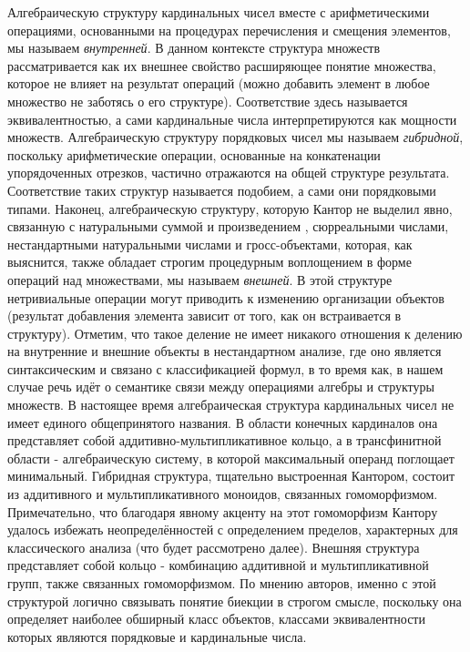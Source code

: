 \documentclass[12pt]{article}
\begin{document}
Алгебраическую структуру кардинальных чисел вместе с арифметическими операциями, основанными на процедурах перечисления и смещения элементов, мы называем {\it внутренней}. В данном контексте структура множеств рассматривается как их внешнее свойство расширяющее понятие множества, которое не влияет на результат операций (можно добавить элемент в любое множество не заботясь о его структуре). Соответствие здесь называется эквивалентностью, а сами кардинальные числа интерпретируются как мощности множеств. Алгебраическую структуру порядковых чисел мы называем {\it гибридной}, поскольку арифметические операции, основанные на конкатенации упорядоченных отрезков, частично отражаются на общей структуре результата. Соответствие таких структур называется подобием, а сами они порядковыми типами. Наконец, алгебраическую структуру, которую Кантор не выделил явно, связанную с натуральными суммой и произведением \cite{hessenberg-sum}, сюрреальными числами, нестандартными натуральными числами и гросс-объектами, которая, как выяснится, также обладает строгим процедурным воплощением в форме операций над множествами, мы называем {\it внешней}. В этой структуре нетривиальные операции могут приводить к изменению организации объектов (результат добавления элемента зависит от того, как он встраивается в структуру). Отметим, что такое деление не имеет никакого отношения к делению на внутренние и внешние объекты в нестандартном анализе, где оно является синтаксическим и связано с классификацией формул, в то время как, в нашем случае речь идёт о семантике связи между операциями алгебры и структуры множеств. В настоящее время алгебраическая структура кардинальных чисел не имеет единого общепринятого названия. В области конечных кардиналов она представляет собой аддитивно-мультипликативное кольцо, а в трансфинитной области - алгебраическую систему, в которой максимальный операнд поглощает минимальный. Гибридная структура, тщательно выстроенная Кантором, состоит из аддитивного и мультипликативного моноидов, связанных гомоморфизмом. Примечательно, что благодаря явному акценту на этот гомоморфизм Кантору удалось избежать неопределённостей с определением пределов, характерных для классического анализа (что будет рассмотрено далее). Внешняя структура представляет собой кольцо - комбинацию аддитивной и мультипликативной групп, также связанных гомоморфизмом. По мнению авторов, именно с этой структурой логично связывать понятие биекции в строгом смысле, поскольку она определяет наиболее обширный класс объектов, классами эквивалентности которых являются порядковые и кардинальные числа. 
\end{document}
